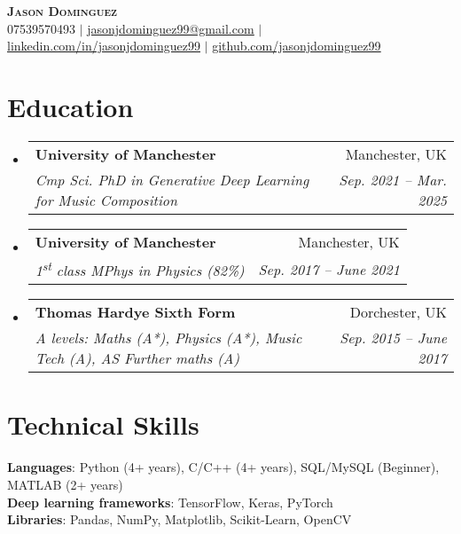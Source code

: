 \documentclass[letterpaper,11pt]{article}
\makeatletter
\newcommand{\resumeSubheading}[4]{
  \vspace{-2pt}\item
    \begin{tabular*}{0.97\textwidth}[t]{l@{\extracolsep{\fill}}r}
      \textbf{#1} & #2 \\
      \textit{\small#3} & \textit{\small #4} \\
    \end{tabular*}\vspace{-7pt}
}
\newcommand{\resumeSubHeadingListStart}{\begin{itemize}[leftmargin=0.15in, label={}]}
\newcommand{\resumeSubHeadingListEnd}{\end{itemize}}
\makeatother
\begin{document}

\begin{center}
    \textbf{\Huge \scshape Jason Dominguez} \\ \vspace{1pt}
    \small 07539570493 $|$ \href{mailto:jasonjdominguez99@gmail.com}{\underline{jasonjdominguez99@gmail.com}} $|$ 
    \href{https://www.linkedin.com/in/jasonjdominguez99/}{\underline{linkedin.com/in/jasonjdominguez99}} $|$
    \href{https://github.com/jasonjdominguez99}{\underline{github.com/jasonjdominguez99}}
\end{center}


\section{Education}
  \resumeSubHeadingListStart
    \resumeSubheading
      {University of Manchester}{Manchester, UK}
      {Cmp Sci. PhD in Generative Deep Learning for Music Composition}{Sep. 2021 -- Mar. 2025}
    \resumeSubheading
      {University of Manchester}{Manchester, UK}
      {1\textsuperscript{st} class MPhys in Physics (82\%)}{Sep. 2017 -- June 2021}
    \resumeSubheading
      {Thomas Hardye Sixth Form}{Dorchester, UK}
      {A levels: Maths (A*), Physics (A*), Music Tech (A), AS Further maths (A)}{Sep. 2015 -- June 2017}
  \resumeSubHeadingListEnd

\section{Technical Skills}
 \begin{itemize}[leftmargin=0.15in, label={}]
    \small{\item{
     \textbf{Languages}{: Python (4+ years), C/C++ (4+ years), SQL/MySQL (Beginner), MATLAB (2+ years)} \\
     \textbf{Deep learning frameworks}{: TensorFlow, Keras, PyTorch} \\
     \textbf{Libraries}{: Pandas, NumPy, Matplotlib, Scikit-Learn, OpenCV} \\
    }}
 \end{itemize}
 
\end{document}
